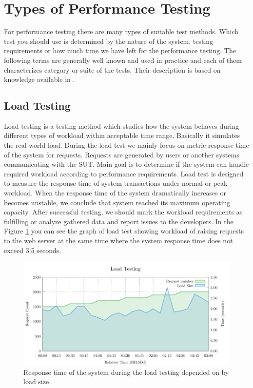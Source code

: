 \section{Types of Performance Testing}
\label{Types of Performance Testing}

For performance testing there are many types of suitable test methods. Which test you should use is determined by the nature of the system, testing requirements or how much time we have left for the performance testing. The following terms are generally well known and used in practice and each of them characterizes category or suite of the tests. Their description is based on knowledge available in \cite{TuPo:TESTS, BUCH:4TYPES, Molyneaux:TAoAPT, ISTQB}.

\subsection*{Load Testing}
Load testing is a testing method which studies how the system behaves during different types of workload within acceptable time range. Basically it simulates the real-world load. During the load test we mainly focus on metric response time of the system for requests. Requests are generated by users or another systems communicating with the SUT. Main goal is to determine if the system can handle required workload according to performance requirements. Load test is designed to measure the response time of system transactions under normal or peak workload. When the response time of the system dramatically increases or becomes unstable, we conclude that system reached its maximum operating capacity. After successful testing, we should mark the workload requirements as fulfilling or analyze gathered data and report issues to the developers. In the Figure \ref{fig:load_test} you can see the graph of load test showing workload of raising requests to the web server at the same time where the system response time does not exceed 3.5 seconds.

\begin{figure}[H]
  \centering
  \includegraphics[width=15cm]{obrazky-figures/load_testing.pdf}
  \caption{Response time of the system during the load testing depended on by load size.}
  \label{fig:load_test}
\end{figure}

